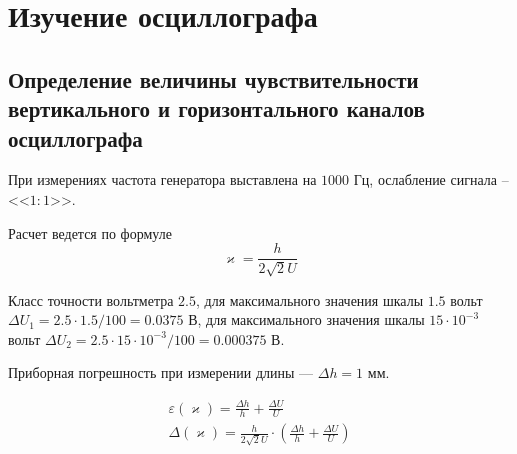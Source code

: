
\newpage
\section{Изучение осциллографа}

\subsection{Определение величины чувствительности вертикального и горизонтального каналов осциллографа}

При измерениях частота генератора выставлена на $1000$ Гц, ослабление сигнала -- <<$1:1$>>.

Расчет ведется по формуле 
\begin{equation}
	\varkappa=\frac{h}{2\sqrt{2}U}
\end{equation}

Класс точности вольтметра $2.5$, для максимального значения шкалы $1.5$ вольт $\Delta{U_1}=2.5\cdot1.5/100=0.0375$ В, для максимального значения шкалы $15\cdot10^{-3}$ вольт $\Delta{U_2}=2.5\cdot15\cdot10^{-3}/100=0.000375$ В.

Приборная погрешность при измерении длины --- $\Delta{h}=1$ мм.

\begin{gather}
	\varepsilon(\varkappa)=\frac{\Delta{h}}{h}+\frac{\Delta{U}}{U}\\
	\Delta(\varkappa)=\frac{h}{2\sqrt{2}U}\cdot(\frac{\Delta{h}}{h}+\frac{\Delta{U}}{U})
\end{gather}

